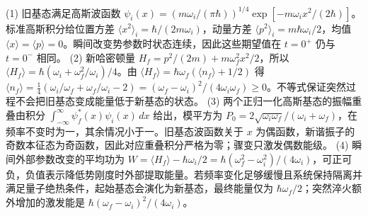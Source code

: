 (1) 旧基态满足高斯波函数 \(\psi_i(x)=(m\omega_i/(\pi\hbar))^{1/4}\exp[-m\omega_ix^2/(2\hbar)]\)。标准高斯积分给位置方差 \(\langle x^2\rangle_i=\hbar/(2m\omega_i)\)，动量方差 \(\langle p^2\rangle_i=m\hbar\omega_i/2\)，均值 \(\langle x\rangle=\langle p\rangle=0\)。瞬间改变势参数时状态连续，因此这些期望值在 \(t=0^+\) 仍与 \(t=0^-\) 相同。
(2) 新哈密顿量 \(H_f=p^2/(2m)+m\omega_f^2x^2/2\)，所以 \(\langle H_f\rangle=\hbar(\omega_i+\omega_f^2/\omega_i)/4\)。由 \(\langle H_f\rangle=\hbar\omega_f(\langle n_f\rangle+1/2)\) 得 \(\langle n_f\rangle=\frac14(\omega_i/\omega_f+\omega_f/\omega_i-2)=(\omega_f-\omega_i)^2/(4\omega_i\omega_f)\ge0\)。不等式保证突然过程不会把旧基态变成能量低于新基态的状态。
(3) 两个正归一化高斯基态的振幅重叠由积分 \(\int_{-\infty}^\infty\psi_f^*(x)\psi_i(x)\,dx\) 给出，模平方为 \(P_0=2\sqrt{\omega_i\omega_f}/(\omega_i+\omega_f)\)，在频率不变时为一，其余情况小于一。旧基态波函数关于 \(x\) 为偶函数，新谐振子的奇数本征态为奇函数，因此对应重叠积分严格为零；骤变只激发偶数能级。
(4) 瞬间外部参数改变的平均功为 \(W=\langle H_f\rangle-\hbar\omega_i/2=\hbar(\omega_f^2-\omega_i^2)/(4\omega_i)\)，可正可负，负值表示降低势刚度时外部提取能量。若频率变化足够缓慢且系统保持隔离并满足量子绝热条件，起始基态会演化为新基态，最终能量仅为 \(\hbar\omega_f/2\)；突然淬火额外增加的激发能是 \(\hbar(\omega_f-\omega_i)^2/(4\omega_i)\)。
